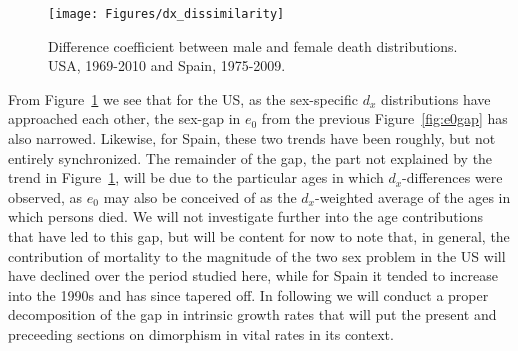 \begin{figure}[!ht]
  \centering
    \caption{Difference coefficient between male and female death distributions.
    USA, 1969-2010 and Spain, 1975-2009.}
     \texttt{[image: Figures/dx\_dissimilarity]}
     \label{fig:dxtheta}
\end{figure}

From Figure~\ref{fig:dxtheta} we see that for the US, as the sex-specific $d_x$
distributions have approached each other, the sex-gap in $e_0$ from the previous
Figure~\ref{fig:e0gap} has also narrowed. Likewise, for Spain, these two trends
have been roughly, but not entirely synchronized. The remainder of the gap, the
part not explained by the trend in Figure~\ref{fig:dxtheta}, will be due to the
particular ages in which $d_x$-differences were observed, as $e_0$ may also be
conceived of as the $d_x$-weighted average of the ages in which persons died. We
will not investigate further into the age contributions that have led to this
gap, but will be content for now to note that, in general, the
contribution of mortality to the magnitude of the two sex problem in the US will
have declined over the period studied here, while for Spain it tended to
increase into the 1990s and has since tapered off. In following we will conduct
a proper decomposition of the gap in intrinsic growth rates that will put the
present and preceeding sections on dimorphism in vital rates in its context.


 \FloatBarrier
